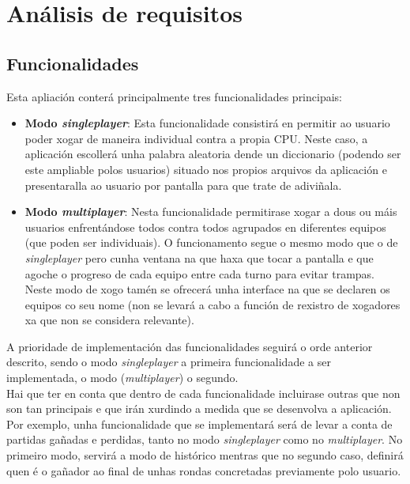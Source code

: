 \chapter{Análisis de requisitos}
\label{chap:requisitos}
\section{Funcionalidades}
Esta apliación conterá principalmente tres funcionalidades principais:
\begin{itemize}
    \item \textbf{Modo \textit{singleplayer}}: Esta funcionalidade consistirá en permitir ao usuario poder xogar de maneira individual contra a propia CPU. Neste caso, a aplicación escollerá unha palabra aleatoria dende un diccionario (podendo ser este ampliable polos usuarios) situado nos propios arquivos da aplicación e presentaralla ao usuario por pantalla para que trate de adiviñala.
    \item \textbf{Modo \textit{multiplayer}}: Nesta funcionalidade permitirase xogar a dous ou máis usuarios enfrentándose todos contra todos agrupados en diferentes equipos (que poden ser individuais). O funcionamento segue o mesmo modo que o de \textit{singleplayer} pero cunha ventana na que haxa que tocar a pantalla e que agoche o progreso de cada equipo entre cada turno para evitar trampas. Neste modo de xogo tamén se ofrecerá unha interface na que se declaren os equipos co seu nome (non se levará a cabo a función de rexistro de xogadores xa que non se considera relevante).
\end{itemize}

A prioridade de implementación das funcionalidades seguirá o orde anterior descrito, sendo o modo \textit{singleplayer} a primeira funcionalidade a ser implementada, o modo (\textit{multiplayer}) o segundo. \\
Hai que ter en conta que dentro de cada funcionalidade incluirase outras que non son tan principais e que irán xurdindo a medida que se desenvolva a aplicación. Por exemplo, unha funcionalidade que se implementará será de levar a conta de partidas gañadas e perdidas, tanto no modo \textit{singleplayer} como no \textit{multiplayer}. No primeiro modo, servirá a modo de histórico mentras que no segundo caso, definirá quen é o gañador ao final de unhas rondas concretadas previamente polo usuario.
 \let\cleardoublepage=\clearpage 
